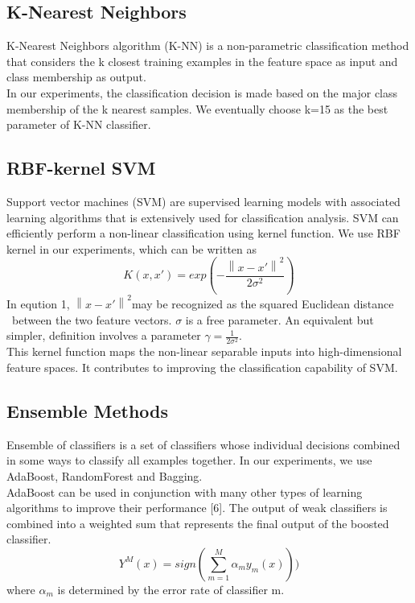 \documentclass{article} %
\begin{document}
\subsection{K-Nearest Neighbors}
K-Nearest Neighbors algorithm (K-NN) is a non-parametric classification method that considers the k closest training examples in the feature space as input and class membership as output.\\

In our experiments, the classification decision is made based on the major class membership of the k nearest samples. We eventually choose k=15 as the best parameter of K-NN classifier. 

\subsection{RBF-kernel SVM}
Support vector machines (SVM) are supervised learning models with associated learning algorithms that is extensively used for classification analysis. SVM can efficiently perform a non-linear classification using kernel function. We use RBF kernel in our experiments, which can be written as
\begin{equation}
K(x, x') = exp(-\frac{\left \| x-x' \right \|^{2}}{2\sigma ^{2}})
\end{equation}
In eqution 1, ${\left \| x-x' \right \|^{2}}$may be recognized as the squared Euclidean distance\, between the two feature vectors. ${\sigma}$ is a free parameter. An equivalent but simpler, definition involves a parameter $\gamma = \frac{1}{2\sigma ^{2}}$.\\
This kernel function maps the non-linear separable inputs into high-dimensional feature spaces. It contributes to improving the classification capability of SVM.

\subsection{Ensemble Methods}
Ensemble of classifiers is a set of classifiers whose individual decisions combined in some ways to classify all examples together. In our experiments, we use AdaBoost, RandomForest and Bagging.\\

AdaBoost can be used in conjunction with many other types of learning algorithms to improve their performance [6]. The output of weak classifiers is combined into a weighted sum that represents the final output of the boosted classifier. \\
\begin{equation}
Y^{M}(x)=sign(\sum_{m=1}^{M}\alpha _{m}y_{m}(x)))
\end{equation}
where $\alpha _{m}$ is determined by the error rate of classifier m. \\
\end{document}
